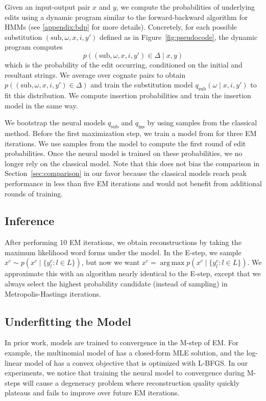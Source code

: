 \documentclass[11pt]{article}
\DeclareMathOperator*{\argmax}{arg\,max}
\begin{document}
Given an input-output pair $x$ and $y$, we compute the probabilities of underlying edits using a dynamic program similar to the forward-backward algorithm for HMMs (see \ref{appendix:bdp} for more details). Concretely, for each possible substitution $(\text{sub}, \omega, x, i, y')$ defined as in Figure~\ref{fig:pseudocode}, the dynamic program computes
$$p((\text{sub}, \omega, x, i, y') \in \Delta \mid x, y)$$
which is the probability of the edit occurring, conditioned on the initial and resultant strings. We average over cognate pairs to obtain $p((\text{sub}, \omega, x, i, y') \in \Delta)$ and train the substitution model $q_{\text{sub}}(\omega \mid x, i, y')$ to fit this distribution. We compute insertion probabilities and train the insertion model in the same way. 

We bootstrap the neural models $q_{\text{sub}}$ and $q_{\text{ins}}$ by using samples from the classical method. Before the first maximization step, we train a model from \citet{bouchard-cote-etal-2009-improved} for three EM iterations. We use samples from the model to compute the first round of edit probabilities. Once the neural model is trained on these probabilities, we no longer rely on the classical model.
Note that this does not bias the comparison in Section~\ref{sec:comparison} in our favor because the classical models reach peak performance in less than five EM iterations and would not benefit from additional rounds of training. 

\subsection{Inference}
After performing 10 EM iterations, we obtain reconstructions by taking the maximum likelihood word forms under the model. In the E-step, we sample $x^c \sim p(x^c \mid \{y_l^c: l\in L\})$, but now we want $x^c = \argmax p(x^c \mid \{y_l^c: l\in L\})$. We approximate this with an algorithm nearly identical to the E-step, except that we always select the highest probability candidate (instead of sampling) in Metropolis-Hastings iterations. 

\subsection{Underfitting the Model}
\label{sec:underfitting}
In prior work, models are trained to convergence in the M-step of EM. For example, the multinomial model of \citet{bouchard-etal-2007-probabilistic} has a closed-form MLE solution, and the log-linear model of \citet{bouchard-cote-etal-2009-improved} has a convex objective that is optimized with L-BFGS. In our experiments, we notice that training the neural model to convergence during M-steps will cause a degeneracy problem where reconstruction quality quickly plateaus and fails to improve over future EM iterations.
\end{document}
